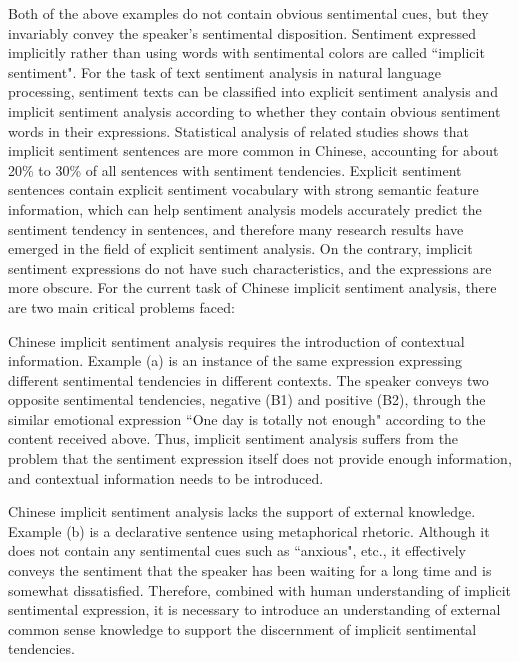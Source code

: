 Both of the above examples do not contain obvious sentimental cues, but they invariably convey the speaker's sentimental disposition.
Sentiment expressed implicitly rather than using words with sentimental colors are called ``implicit sentiment"\cite{PanDongXing2020}.
For the task of text sentiment analysis in natural language processing, sentiment texts can be classified into explicit sentiment analysis and implicit sentiment analysis according to whether they contain obvious sentiment words in their expressions\cite{liu2020sentiment}.
Statistical analysis of related studies\cite{jian2016constitution,chen2016implicit,liao2019identification} shows that implicit sentiment sentences are more common in Chinese, accounting for about 20\% to 30\% of all sentences with sentiment tendencies.
Explicit sentiment sentences contain explicit sentiment vocabulary with strong semantic feature information, which can help sentiment analysis models accurately predict the sentiment tendency in sentences, and therefore many research results have emerged in the field of explicit sentiment analysis.
On the contrary, implicit sentiment expressions do not have such characteristics, and the expressions are more obscure. For the current task of Chinese implicit sentiment analysis, there are two main critical problems faced:


Chinese implicit sentiment analysis requires the introduction of contextual information. Example (a) is an instance of the same expression expressing different sentimental tendencies in different contexts. The speaker conveys two opposite sentimental tendencies, negative (B1) and positive (B2), through the similar emotional expression ``One day is totally not enough" according to the content received above. Thus, implicit sentiment analysis suffers from the problem that the sentiment expression itself does not provide enough information, and contextual information needs to be introduced.

Chinese implicit sentiment analysis lacks the support of external knowledge. Example (b) is a declarative sentence using metaphorical rhetoric. Although it does not contain any sentimental cues such as ``anxious", etc., it effectively conveys the sentiment that the speaker has been waiting for a long time and is somewhat dissatisfied. Therefore, combined with human understanding of implicit sentimental expression, it is necessary to introduce an understanding of external common sense knowledge to support the discernment of implicit sentimental tendencies.

